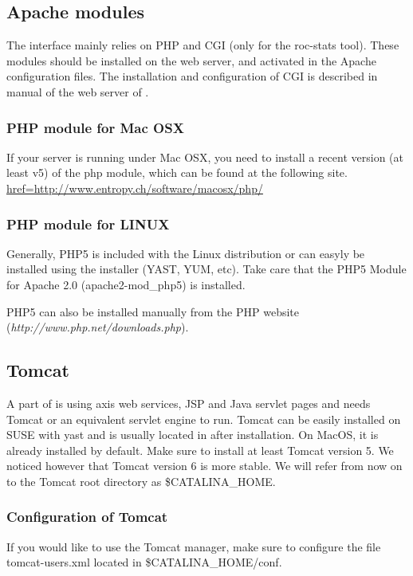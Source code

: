 \documentclass{book}
\begin{document}
\subsection{Apache modules}

The \neat interface mainly relies on PHP and CGI (only for the roc-stats tool).
These modules should be installed on the web server, and activated in the Apache configuration files.
The installation and configuration of CGI is described in manual of the web server of \RSAT.

\subsubsection{PHP module for Mac OSX}

If your server is running under Mac OSX, you need to install a recent
version (at least v5) of the php module, which can be found at the following site.
\url{href=http://www.entropy.ch/software/macosx/php/}

\subsubsection{PHP module for LINUX}

Generally, PHP5 is included with the Linux distribution or can easyly be installed using the installer (YAST, YUM, etc). Take care that the PHP5 Module for Apache 2.0 (apache2-mod_php5) is installed.

PHP5 can also be installed manually from the PHP website (\textit{http://www.php.net/downloads.php}).

\subsection{Tomcat}

A part of \neat is using axis web services, JSP and Java servlet pages and needs Tomcat
or an equivalent servlet engine to run.
Tomcat can be easily installed on SUSE with yast and is
usually located in  after installation.
On MacOS, it is already installed by default.
Make sure to install at least Tomcat version 5.
We noticed however that Tomcat version 6 is more stable.
We will refer from now on to the Tomcat root directory as \$CATALINA\_HOME.

\subsubsection{Configuration of Tomcat}
If you would like to use the Tomcat manager, make sure to configure the file
tomcat-users.xml located in \$CATALINA\_HOME/conf.
\end{document}
